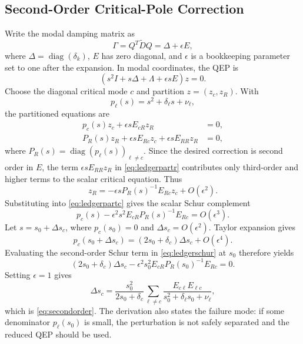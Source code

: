 \documentclass[journal]{IEEEtran}
\newcommand{\Dt}{\widetilde D}
\newcommand{\diag}{\operatorname{diag}}
\begin{document}
\subsection{Second-Order Critical-Pole Correction}

Write the modal damping matrix as
\begin{equation}
\Gamma=Q^T\Dt Q=\Delta+\epsilon E,
\end{equation}
where $\Delta=\diag(\delta_k)$, $E$ has zero diagonal, and $\epsilon$ is a bookkeeping parameter set to one after the expansion. In modal coordinates, the QEP is
\begin{equation}
\left(s^2I+s\Delta+\Lambda+\epsilon sE\right)z=0.
\end{equation}
Choose the diagonal critical mode $c$ and partition $z=(z_c,z_R)$. With
\begin{equation}
p_\ell(s)=s^2+\delta_\ell s+\nu_\ell,
\end{equation}
the partitioned equations are
\begin{align}
p_c(s)z_c+\epsilon sE_{cR}z_R&=0,
\label{eq:ledgerpartc}\\
P_R(s)z_R+\epsilon sE_{Rc}z_c+\epsilon sE_{RR}z_R&=0,
\label{eq:ledgerpartr}
\end{align}
where $P_R(s)=\diag(p_\ell(s))_{\ell\neq c}$. Since the desired correction is second order in $E$, the term $\epsilon sE_{RR}z_R$ in \eqref{eq:ledgerpartr} contributes only third-order and higher terms to the scalar critical equation. Thus
\begin{equation}
z_R=-\epsilon sP_R(s)^{-1}E_{Rc}z_c+O(\epsilon^2).
\end{equation}
Substituting into \eqref{eq:ledgerpartc} gives the scalar Schur complement
\begin{equation}
p_c(s)-\epsilon^2s^2E_{cR}P_R(s)^{-1}E_{Rc}
=O(\epsilon^3).
\label{eq:ledgerschur}
\end{equation}
Let $s=s_0+\Delta s_c$, where $p_c(s_0)=0$ and $\Delta s_c=O(\epsilon^2)$. Taylor expansion gives
\begin{equation}
p_c(s_0+\Delta s_c)
=(2s_0+\delta_c)\Delta s_c+O(\epsilon^4).
\end{equation}
Evaluating the second-order Schur term in \eqref{eq:ledgerschur} at $s_0$ therefore yields
\begin{equation}
(2s_0+\delta_c)\Delta s_c
-\epsilon^2s_0^2
E_{cR}P_R(s_0)^{-1}E_{Rc}=0.
\end{equation}
Setting $\epsilon=1$ gives
\begin{equation}
\Delta s_c=
\frac{s_0^2}{2s_0+\delta_c}
\sum_{\ell\neq c}
\frac{E_{c\ell}E_{\ell c}}
{s_0^2+\delta_\ell s_0+\nu_\ell},
\end{equation}
which is \eqref{eq:secondorder}. The derivation also states the failure mode: if some denominator $p_\ell(s_0)$ is small, the perturbation is not safely separated and the reduced QEP should be used.
\end{document}
